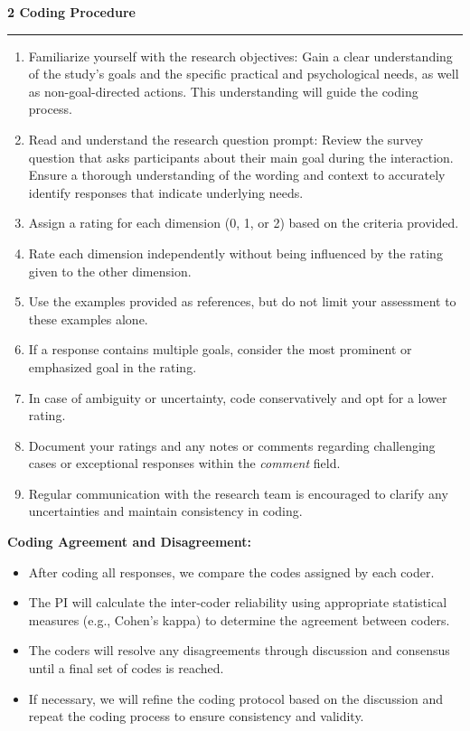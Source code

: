 \documentclass[10pt,a4paper]{protocol}
\newcommand\category[2]{
{\Large\bfseries\color{emphasis} \vspace{0.25em} #1 \hspace{0.5em} #2 \\ [-0.6em] \rule{\textwidth}{0.4pt} \vspace{0.25em}}
}
\begin{document}
\vspace{1em}

\category{2}{Coding Procedure}

\begin{enumerate}
    \item Familiarize yourself with the research objectives: Gain a clear understanding of the study's goals and the specific practical and psychological needs, as well as non-goal-directed actions. This understanding will guide the coding process.
    \item Read and understand the research question prompt: Review the survey question that asks participants about their main goal during the interaction. Ensure a thorough understanding of the wording and context to accurately identify responses that indicate underlying needs.
    \item Assign a rating for each dimension (0, 1, or 2) based on the criteria provided.
    \item Rate each dimension independently without being influenced by the rating given to the other dimension.
    \item Use the examples provided as references, but do not limit your assessment to these examples alone.
    \item If a response contains multiple goals, consider the most prominent or emphasized goal in the rating.
    \item In case of ambiguity or uncertainty, code conservatively and opt for a lower rating.
    \item Document your ratings and any notes or comments regarding challenging cases or exceptional responses within the \textit{comment} field.
    \item Regular communication with the research team is encouraged to clarify any uncertainties and maintain consistency in coding.
\end{enumerate}

\newpage
\vspace*{3em}
\textbf{Coding Agreement and Disagreement:}
\begin{itemize}
    \item After coding all responses, we compare the codes assigned by each coder.
    \item The PI will calculate the inter-coder reliability using appropriate statistical measures (e.g., Cohen's kappa) to determine the agreement between coders.
    \item The coders will resolve any disagreements through discussion and consensus until a final set of codes is reached.
    \item If necessary, we will refine the coding protocol based on the discussion and repeat the coding process to ensure consistency and validity.
\end{itemize}
\end{document}
